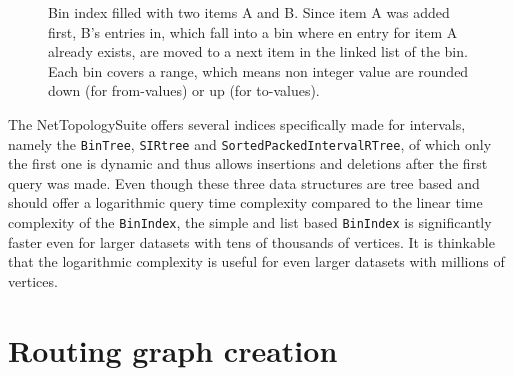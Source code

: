 \begin{figure}[h]
\begin{figcenter}
			\end{figcenter}
			\caption{Bin index filled with two items A and B. Since item A was added first, B's entries in, which fall into a bin where en entry for item A already exists, are moved to a next item in the linked list of the bin. Each bin covers a range, which means non integer value are rounded down (for from-values) or up (for to-values).}
			\label{fig:bin-index}
		\end{figure}
		
		The NetTopologySuite offers several indices specifically made for intervals, namely the \texttt{BinTree}, \texttt{SIRtree} and \texttt{SortedPackedIntervalRTree}, of which only the first one is dynamic and thus allows insertions and deletions after the first query was made.
		Even though these three data structures are tree based and should offer a logarithmic query time complexity compared to the linear time complexity of the \texttt{BinIndex}, the simple and list based \texttt{BinIndex} is significantly faster even for larger datasets with tens of thousands of vertices.
		It is thinkable that the logarithmic complexity is useful for even larger datasets with millions of vertices.
		
		
\section{Routing graph creation}
\label{sec:visibility-graph-creation}
		
